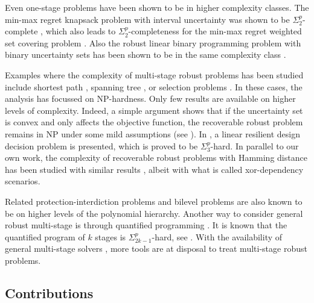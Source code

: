 \documentclass[a4paper,abstracton]{scrartcl}
\begin{document}
Even one-stage problems have been shown to be in higher complexity classes. The min-max regret knapsack problem with interval uncertainty was shown to be $\Sigma^p_2$-complete \cite{deineko2010pinpointing}, which also leads to $\Sigma^p_2$-completeness for the min-max regret weighted set covering problem \cite{coco2022robust}. Also the robust linear binary programming problem with binary uncertainty sets has been shown to be in the same complexity class \cite{claus2020note}.

Examples where the complexity of multi-stage robust problems has been studied include
shortest path \cite{busing2012recoverable}, spanning tree \cite{kasperski2011approximability}, or selection problems \cite{kasperski2017robust,goerigk2022recoverable}. In these cases, the analysis has focussed on NP-hardness. Only few results are available on higher levels of complexity. Indeed, a simple argument shows that if the uncertainty set is convex and only affects the objective function, the recoverable robust problem remains in NP under some mild assumptions (see \cite{hanasusanto2015k,buchheim2017min,bold2020}). In \cite{pfetsch2021generic}, a linear resilient design decision problem is presented, which is proved to be $\Sigma^p_3$-hard. In parallel to our own work, the complexity of recoverable robust problems with Hamming distance has been studied with similar results \cite{grune2022complexity}, albeit with what is called xor-dependency scenarios.

Related protection-interdiction problems \cite{nabli2022complexity} and bilevel problems \cite{caprara2016bilevel} are also known to be on higher levels of the polynomial hierarchy. Another way to consider general robust multi-stage is through quantified programming \cite{goerigk2021multistage}. It is known that the quantified program of $k$ stages is $\Sigma^p_{2k-1}$-hard, see \cite{chistikov2017complexity,nguyen2020computational}. With the availability of general multi-stage solvers \cite{phdhartisch}, more tools are at disposal to treat multi-stage robust problems.

\subsection{Contributions}
\end{document}

